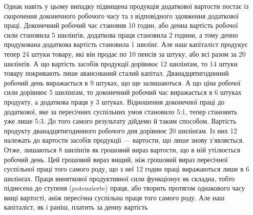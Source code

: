 Однак навіть у цьому випадку підвищена продукція додаткової
вартости постає із скорочення доконечного робочого часу та
з відповідного здовження додаткової праці.  Доконечний робочий
час становив 10 годин, або денна вартість робочої сили становила
5 шилінґів, додаткова праця становила 2 години, а тому
денно продукована додаткова вартість становила 1 шилінґ. Але
наш капіталіст продукує тепер 24 штуки товару, які він продає
по 10 пенсів за штуку, або всі разом за 20 шилінґів. А що вартість
засобів продукції дорівнює 12 шилінґам, то 14 штуки товару
покривають лише авансований сталий капітал. Дванадцятигодинний
робочий день виражається в 9 штуках, що ще залишаються.
А що ціна робочої сили дорівнює 5 шилінґам, то доконечний робочий
час виражається в 6 штуках продукту, а додаткова праця
у 3 штуках. Відношення доконечної праці до додаткової, яке за
пересічних суспільних умов становило 5:1, тепер становить
уже лише 5:3. До того самого результату дійдемо й таким способом.
Вартість продукту дванадцятигодинного робочого дня
дорівнює 20 шилінґам. Із них 12 належать до вартости засобів
продукції — вартости, що лише знову з’являється. Отже, лишаються
8 шилінґів як грошовий вираз вартости, що в ній утілюється робочий день.
Цей грошовий вираз вищий, ніж грошовий
вираз пересічної суспільної праці того самого роду, що з неї
12 годин праці виражаються лише в 6 шилінґах. Праця виняткової продуктивної сили
функціонує як складна, тобто піднесена
до ступеня (potenzierte) праця, або творить протягом однакового
часу вищі вартості, аніж пересічна суспільна праця того самого
роду. Але наш капіталіст, як і раніш, платить за денну вартість
